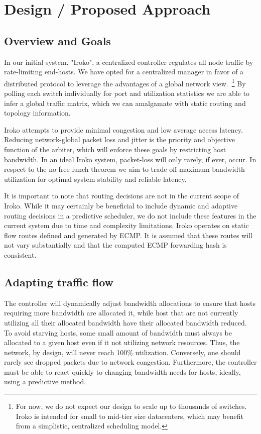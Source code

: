 

\section{Design / Proposed Approach}
\label{sec:design}

\subsection{Overview and Goals}
In our initial system, "Iroko", a centralized controller regulates all 
node traffic by rate-limiting end-hosts. We have opted for a centralized 
manager in favor of a distributed protocol to leverage the advantages of a 
global network view.~\footnote{For now, we do not expect our design to scale up 
to thousands of switches. Iroko is intended for small to mid-tier size datacenters,
which may benefit from a simplistic, centralized scheduling model.}
By polling each switch individually for port and utilization statistics we are 
able to infer a global traffic matrix, which we can amalgamate with static 
routing and topology information. 

Iroko attempts to provide minimal congestion and low average access latency. Reducing 
network-global packet loss and jitter is the priority and objective function of 
the arbiter, which will enforce these goals by restricting host bandwidth. In 
an ideal Iroko system, packet-loss will only rarely, if ever, occur. In respect 
to the no free lunch theorem we aim to trade off maximum bandwidth utilization for 
optimal system stability and reliable latency.

It is important to note that routing decisions are not in the current scope of 
Iroko. While it may certainly be beneficial to include dynamic and adaptive 
routing decisions in a predictive scheduler, we do not include these features 
in the current system due to time and complexity limitations. Iroko operates on 
static flow routes defined and generated by ECMP. It is assumed that these 
routes will not vary substantially and that the computed ECMP forwarding hash 
is consistent.

\subsection{Adapting traffic flow}

The controller will dynamically adjust bandwidth allocations to ensure that hosts 
requiring more bandwidth are allocated it, while host that are not currently 
utilizing all their allocated bandwidth have their allocated bandwidth reduced. 
To avoid starving hosts, some small amount of bandwidth must always be 
allocated to a given host even if it not utilizing network resources. Thus, the 
network, by design, will never reach 100\% utilization. Conversely, one should rarely see
dropped packets due to network 
congestion. Furthermore, the controller must be able to react quickly to 
changing bandwidth needs for hosts, ideally, using a predictive method.


